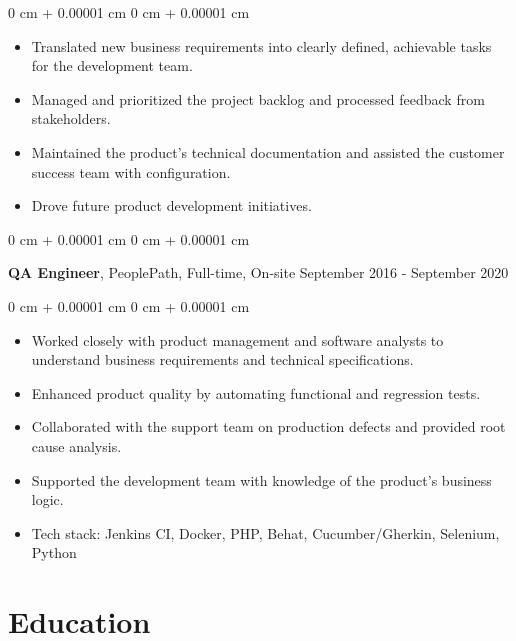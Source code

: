 \documentclass[10pt, letterpaper]{article}
\newenvironment{highlights}{
    \begin{itemize}[
        topsep=0.10 cm,
        parsep=0.10 cm,
        partopsep=0pt,
        itemsep=0pt,
        leftmargin=0 cm + 10pt
    ]
}{
    \end{itemize}
} %
\newenvironment{onecolentry}{
    \begin{adjustwidth}{
        0 cm + 0.00001 cm
    }{
        0 cm + 0.00001 cm
    }
}{
    \end{adjustwidth}
} %
\newenvironment{twocolentry}[2][]{
    \onecolentry
    \def\secondColumn{#2}
    \setcolumnwidth{\fill, 4.5 cm}
    \begin{paracol}{2}
}{
    \switchcolumn \raggedleft \secondColumn
    \end{paracol}
    \endonecolentry
} %
\begin{document}
        \vspace{0.10 cm}
        \begin{onecolentry}
            \begin{highlights}
                \item Translated new business requirements into clearly defined, achievable tasks for the development team.
                \item Managed and prioritized the project backlog and processed feedback from stakeholders.
                \item Maintained the product's technical documentation and assisted the customer success team with configuration.
                \item Drove future product development initiatives.
            \end{highlights}
        \end{onecolentry}

        \vspace{0.2 cm}

        \begin{twocolentry}{
            September 2016 - September 2020
        }
            \textbf{QA Engineer}, PeoplePath, Full-time, On-site\end{twocolentry}

        \vspace{0.10 cm}
        \begin{onecolentry}
            \begin{highlights}
                \item Worked closely with product management and software analysts to understand business requirements and technical specifications.
                \item Enhanced product quality by automating functional and regression tests.
                \item Collaborated with the support team on production defects and provided root cause analysis.
                \item Supported the development team with knowledge of the product's business logic.
                \item Tech stack: Jenkins CI, Docker, PHP, Behat, Cucumber/Gherkin, Selenium, Python
            \end{highlights}
        \end{onecolentry}

    \section{Education}
\end{document}
